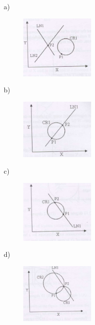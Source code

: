 \documentclass[journal,12pt,onecolumn]{IEEEtran}
\theoremstyle{remark}
\begin{document}
\begin{enumerate}
\begin{itemize}
   

    \item[a)]\begin{figure}[h]
    \includegraphics[width=0.35\textwidth]{figures/63-a-pi-2008-gate.png}
    \caption{}
    \label{q63a}
    \end{figure}
    \item[b)]\begin{figure}[h] \includegraphics[width=0.35\textwidth]{figures/63-b-pi-2008-gate.png}
    \caption{}
    \label{q63b}
    \end{figure}
    \item[c)]\begin{figure}[h] \includegraphics[width=0.35\textwidth]{figures/63-c-pi-2008-gate.png}
    \caption{}
    \label{q63c}
    \end{figure}
    \item[d)]\begin{figure}[h] \includegraphics[width=0.35\textwidth]{figures/63-d-pi-2008-gate.png}
    \caption{}
    \label{q63d}
    \end{figure}
\end{itemize}



\end{enumerate}
\end{document}
